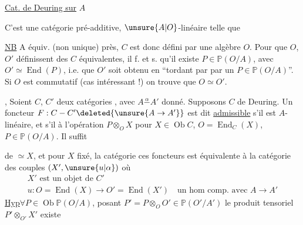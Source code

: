 

\uline{Cat. de Deuring sur} $A$

C'est une catégorie pré-additive, $\unsure{A|O}$-linéaire telle que

\uline{NB} A équiv. (non unique) près, $C$ est donc défini par une algèbre $O$. Pour que $O$, $O'$ définissent des $C$ équivalentes, il f. et s. qu'il existe $P\in\mathbb P(O/A)$, avec $O'\simeq\operatorname{End}(P)$, i.e. que $O'$ soit obtenu en ``tordant par  par un $P\in\mathbb P(O/A)$''. Si $O$ est commutatif (cas intéressant !) on trouve que $O\simeq O'$.

,
Soient $C$, $C'$ deux catégories , avec $A\overset{\alpha}{\mathbin{-}}A'$ donné. Supposons $C$ de Deuring. Un foncteur $F:C\mathbin{-}C'\deleted{\unsure{A\to A'}}$ est dit \uline{admissible}  s'il est $A$-linéaire, et s'il  à l'opération $P\otimes_O X$ pour $X\in\operatorname{Ob}C$, $O=\operatorname{End}_C(X)$, $P\in\mathbb P(O/A)$. Il suffit



de  $\simeq X$, et pour $X$ fixé, la  catégorie  ces foncteurs est équivalente à la catégorie des couples $(X',\unsure{u|\alpha})$ où
\[
\begin{gathered}
X'\text{ est un objet de }C'\\
u:O=\operatorname{End}(X)\longrightarrow O'=\operatorname{End}(X')\quad\text{un hom comp. avec }A\to A'
\end{gathered}
\]
\uline{Hyp}\quad $\forall P\in\operatorname{Ob}\mathbb P(O/A)$,  posant $P'=P\otimes_O O'\in\mathbb P(O'/A')$ le produit tensoriel $P'\otimes_{O'}X'$ existe

